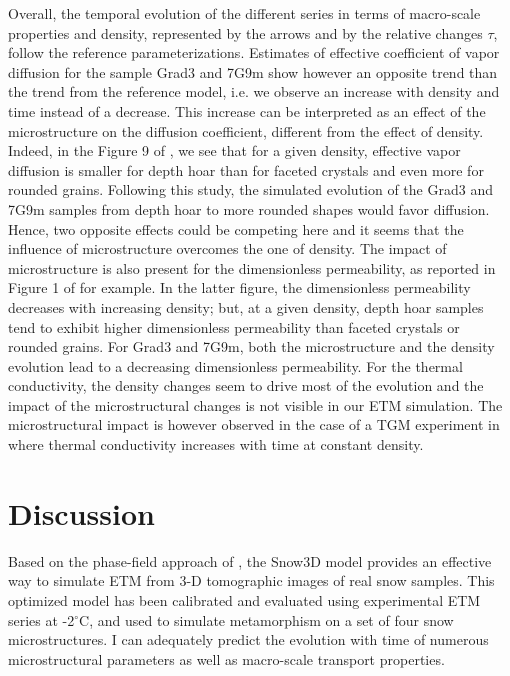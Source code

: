 \documentclass[draft,ms]{agujournal2019}
\begin{document}
Overall, the temporal evolution of the different series in terms of macro-scale properties and density, represented by the arrows and by the relative changes $\tau$, follow the reference parameterizations. Estimates of effective coefficient of vapor diffusion for the sample Grad3 and 7G9m show however an opposite trend than the trend from the reference model, i.e. we observe an increase with density and time instead of a decrease. This increase can be interpreted as an effect of the microstructure on the diffusion coefficient, different from the effect of density. Indeed, in the Figure 9 of , we see that for a given density, effective vapor diffusion is smaller for depth hoar than for faceted crystals and even more for rounded grains. Following this study, the simulated evolution of the Grad3 and 7G9m samples from depth hoar to more rounded shapes would favor diffusion. Hence, two opposite effects could be competing here and it seems that the influence of microstructure overcomes the one of density. The impact of microstructure is also present for the dimensionless permeability, as reported in Figure 1 of  for example. In the latter figure, the dimensionless permeability decreases with increasing density; but, at a given density, depth hoar samples tend to exhibit higher dimensionless permeability than faceted crystals or rounded grains. For Grad3 and 7G9m, both the microstructure and the density evolution lead to a decreasing dimensionless permeability. For the thermal conductivity, the density changes seem to drive most of the evolution and the impact of the microstructural changes is not visible in our ETM simulation. The microstructural impact is however observed in the case of a TGM experiment in  where thermal conductivity increases with time at constant density.  


\section{Discussion}
\label{sec:disc}
Based on the phase-field approach of , the Snow3D model provides an effective way to simulate ETM from 3-D tomographic images of real snow samples. This optimized model has been calibrated and evaluated using experimental ETM series at -2$^\circ$C, and used to simulate metamorphism on a set of four snow microstructures. I can adequately predict the evolution with time of numerous microstructural parameters as well as macro-scale transport properties.
\end{document}
